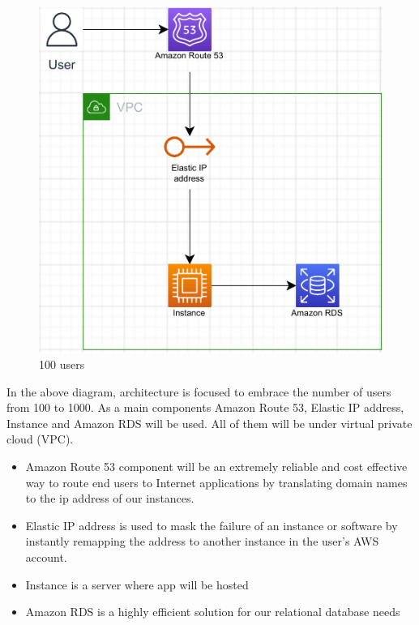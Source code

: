 \begin{figure}[h]
    \centering
    \includegraphics[scale=0.85]{figures/d1.pdf}
    \caption{100 users}
    \label{fig:gp}
\end{figure}


\pagebreak

In the above diagram, architecture is focused to embrace the number of users from 100 to 1000. As a main components Amazon Route 53, Elastic IP address, Instance and Amazon RDS will be used. All of them will be under virtual private cloud (VPC).

\begin{itemize}
  \item Amazon Route 53 component will be an extremely reliable and cost effective way to route end users to Internet applications by translating domain names to the ip address of our instances.
  \item Elastic IP address is used to mask the failure of an instance or software by instantly remapping the address to another instance in the user's AWS account.
  \item Instance is a server where app will be hosted
  \item Amazon RDS is a highly efficient solution for our relational database needs
\end{itemize}


